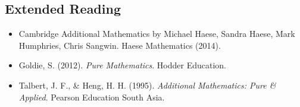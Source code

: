 \subsection*{Extended Reading}
\begin{itemize}
  \item Cambridge Additional Mathematics by Michael Haese, Sandra Haese, Mark
  Humphries, Chris Sangwin. Haese Mathematics (2014).
  \item Goldie, S. (2012). \emph{Pure Mathematics}. Hodder Education.
  \item Talbert, J. F., \& Heng, H. H. (1995). \emph{Additional Mathematics: Pure \& Applied}. Pearson Education South Asia.
\end{itemize}

